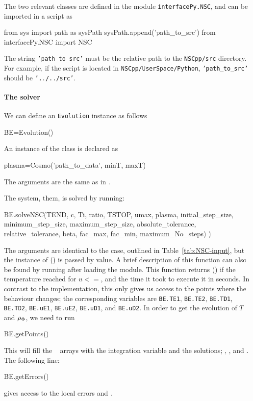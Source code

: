 \documentclass[11pt,a4paper]{article}
\begin{document}
The two relevant classes are defined in the module {\tt interfacePy.NSC}, and can be imported in a \PY script as 
%
\begin{py}
	from sys import path as sysPath
	sysPath.append('path_to_src')
	from interfacePy.NSC import NSC 
\end{py}
%
The string {\tt 'path\_to\_src'} must be the relative path to the {\tt NSCpp/src} directory. For example, if the script is located in {\tt NSCpp/UserSpace/Python}, {\tt 'path\_to\_src'} should be {\tt '../../src'}.

\paragraph{The solver}
%
We can define an {\tt Evolution} instance as follows 
%
\begin{py}
	BE=Evolution()
\end{py}

An instance of the  class is declared as 
%
\begin{cpp}
	plasma=Cosmo('path_to_data', minT, maxT)
\end{cpp}
%
The arguments are the same as in \CPP.

The system, them, is solved by running:
%
\begin{cpp}
	BE.solveNSC(TEND, c, Ti, ratio, TSTOP, umax, plasma,
						initial_step_size, minimum_step_size, maximum_step_size, absolute_tolerance, 
						relative_tolerance, beta, fac_max, fac_min, maximum_No_steps)
					  )
\end{cpp}
%
The arguments are identical to the \CPP case, outlined in Table~\ref{tab:NSC-input}, but the instance of  () is passed by value. A brief description of this function can also be found by running  after loading the module. This function returns  () if the temperature reached  for $u<=$, and the time it took to execute it in seconds.
%
In contrast to the \CPP implementation, this only gives us access to the points where the behaviour changes; the corresponding variables are {\tt BE.TE1}, {\tt BE.TE2}, {\tt BE.TD1}, {\tt BE.TD2}, {\tt BE.uE1}, {\tt BE.uE2}, {\tt BE.uD1}, and {\tt BE.uD2}. In order to get the evolution of $T$ and $\rho_{\Phi}$, we need to run 
%
\begin{py}
	BE.getPoints()
\end{py}
%
This will fill the ~\cite{harris2020array} arrays with the integration variable and the solutions; , , and . The following line:
%
\begin{py}
	BE.getErrors()
\end{py}
%
gives access to the local errors  and .
\end{document}
